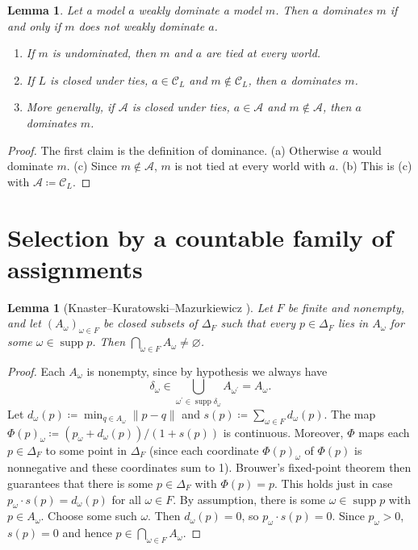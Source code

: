 \documentclass[11pt]{article}
\newtheorem{lemma}[theorem]{Lemma}
\theoremstyle{definition}
\theoremstyle{remark}
\newcommand{\C}{\mathcal C}
\newcommand{\supp}{\operatorname{supp}}
\begin{document}
\begin{lemma}\label{lem:ties}
Let a model $a$ weakly dominate a model $m$. Then $a$ dominates $m$ if and only if $m$ does not weakly dominate $a$.
\begin{enumerate}[label=(\alph*)]
\item If $m$ is undominated, then $m$ and $a$ are tied at every world.
\item If $L$ is closed under ties, $a\in\C_L$ and $m\notin\C_L$, then $a$ dominates $m$.
\item More generally, if $\mathcal A$ is closed under ties, $a\in\mathcal A$ and $m\notin\mathcal A$, then $a$ dominates $m$.
\end{enumerate}
\end{lemma}
\begin{proof}
The first claim is the definition of dominance. (a) Otherwise $a$ would dominate $m$. (c) Since $m\notin\mathcal A$, $m$ is not tied at every world with $a$. (b) This is (c) with $\mathcal A\coloneqq\C_L$.
\end{proof}

\section{Selection by a countable family of assignments}\label{sec:general}

\begin{lemma}[Knaster--Kuratowski--Mazurkiewicz {\cite{KKM}}]\label{lem:kkm}
Let $F$ be finite and nonempty, and let $(A_\omega)_{\omega\in F}$ be closed subsets of $\Delta_F$ such that every $p\in\Delta_F$ lies in $A_\omega$ for some $\omega\in\supp p$. Then $\bigcap_{\omega\in F}A_\omega\ne\varnothing$.
\end{lemma}
\begin{proof}
Each $A_\omega$ is nonempty, since by hypothesis we always have
\[
\delta_\omega\in\bigcup_{\omega^\prime\in\supp \delta_\omega}A_{\omega^\prime}=A_\omega.
\]
Let $d_\omega(p)\coloneqq\min_{q\in A_\omega}\lVert p-q \rVert$ and $s(p)\coloneqq\sum_{\omega\in F} d_\omega(p)$. The map $\Phi(p)_\omega\coloneqq(p_\omega+d_\omega(p))/(1+s(p))$ is continuous. Moreover, $\Phi$ maps each $p\in\Delta_F$ to some point in $\Delta_F$ (since each coordinate $\Phi(p)_\omega$ of $\Phi(p)$ is nonnegative and these coordinates sum to 1). Brouwer's fixed-point theorem then guarantees that there is some $p\in\Delta_F$ with $\Phi(p)=p$. This holds just in case $p_\omega\cdot s(p)=d_\omega(p)$ for all $\omega\in F$. By assumption, there is some $\omega\in\supp p$ with $p\in A_\omega$. Choose some such $\omega$. Then $d_\omega(p)=0$, so $p_\omega\cdot s(p)=0$. Since $p_\omega>0$, $s(p)=0$ and hence $p\in\bigcap_{\omega\in F}A_\omega$.
\end{proof}
\end{document}
